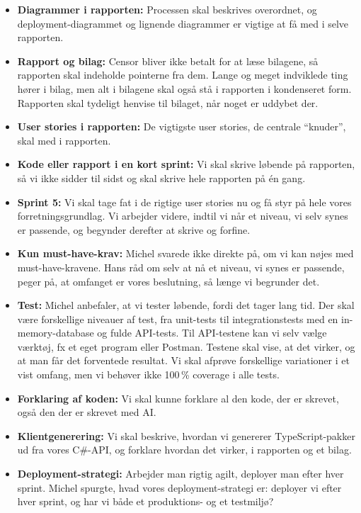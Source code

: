 \documentclass[a4paper,11pt]{article}
\begin{document}
\begin{itemize}
    \item \textbf{Diagrammer i rapporten:} Processen skal beskrives overordnet, og deployment-diagrammet og lignende diagrammer er vigtige at få med i selve rapporten.
    \item \textbf{Rapport og bilag:} Censor bliver ikke betalt for at læse bilagene, så rapporten skal indeholde pointerne fra dem. Lange og meget indviklede ting hører i bilag, men alt i bilagene skal også stå i rapporten i kondenseret form. Rapporten skal tydeligt henvise til bilaget, når noget er uddybet der.
    \item \textbf{User stories i rapporten:} De vigtigste user stories, de centrale ``knuder'', skal med i rapporten.
    \item \textbf{Kode eller rapport i en kort sprint:} Vi skal skrive løbende på rapporten, så vi ikke sidder til sidst og skal skrive hele rapporten på én gang.
    \item \textbf{Sprint 5:} Vi skal tage fat i de rigtige user stories nu og få styr på hele vores forretningsgrundlag. Vi arbejder videre, indtil vi når et niveau, vi selv synes er passende, og begynder derefter at skrive og forfine.
    \item \textbf{Kun must-have-krav:} Michel svarede ikke direkte på, om vi kan nøjes med must-have-kravene. Hans råd om selv at nå et niveau, vi synes er passende, peger på, at omfanget er vores beslutning, så længe vi begrunder det.
    \item \textbf{Test:} Michel anbefaler, at vi tester løbende, fordi det tager lang tid. Der skal være forskellige niveauer af test, fra unit-tests til integrationstests med en in-memory-database og fulde API-tests. Til API-testene kan vi selv vælge værktøj, fx et eget program eller Postman. Testene skal vise, at det virker, og at man får det forventede resultat. Vi skal afprøve forskellige variationer i et vist omfang, men vi behøver ikke 100\,\% coverage i alle tests.
    \item \textbf{Forklaring af koden:} Vi skal kunne forklare al den kode, der er skrevet, også den der er skrevet med AI.
    \item \textbf{Klientgenerering:} Vi skal beskrive, hvordan vi genererer TypeScript-pakker ud fra vores C\#-API, og forklare hvordan det virker, i rapporten og et bilag.
    \item \textbf{Deployment-strategi:} Arbejder man rigtig agilt, deployer man efter hver sprint. Michel spurgte, hvad vores deployment-strategi er: deployer vi efter hver sprint, og har vi både et produktions- og et testmiljø?
\end{itemize}
\end{document}
